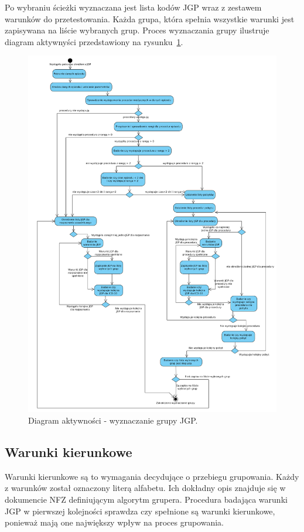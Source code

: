 Po wybraniu ścieżki wyznaczana jest lista kodów JGP wraz z zestawem warunków do przetestowania. Każda grupa, która spełnia wszystkie warunki jest zapisywana na liście wybranych grup. Proces wyznaczania grupy ilustruje diagram aktywnyści przedstawiony na rysunku~\ref{img:diagram_activity_jgp}.
\newpage
\begin{figure}[!ht]
\centering
\includegraphics[scale=0.4]{images/activity-jgp} 
\caption[Diagram aktywności]{Diagram aktywności - wyznaczanie grupy JGP.}
\label{img:diagram_activity_jgp}
\end{figure}

\subsection{Warunki kierunkowe}
\label{sec:warunkiKierunkowe}
Warunki kierunkowe są to wymagania decydujące o przebiegu grupowania. Każdy z warunków został oznaczony literą alfabetu. Ich dokładny opis znajduje się w dokumencie NFZ definiującym algorytm grupera\cite{algorytm_grupera}. Procedura badająca warunki JGP w pierwszej kolejności sprawdza czy spełnione są warunki kierunkowe, ponieważ mają one największy wpływ na proces grupowania.

